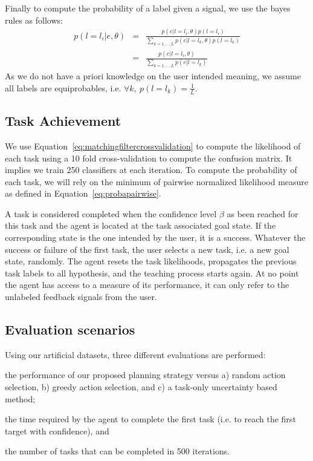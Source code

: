 Finally to compute the probability of a label given a signal, we use the bayes rules as follows: 
%
\begin{eqnarray}
    p(l = l_i|e,\theta) &=& \frac{p(e|l = l_i, \theta)p(l = l_i)}{\sum_{k = 1,\ldots, L}{p(e|l = l_k,\theta)p(l = l_k)}}\nonumber \\
    &=& \frac{p(e|l=l_i, \theta)}{\sum_{k = 1,\ldots, L} p(e|l=l_k)} \nonumber
\end{eqnarray}
%
As we do not have a priori knowledge on the user intended meaning, we assume all labels are equiprobables, i.e. $\forall k,~p(l = l_k) = \frac{1}{L}$.

\subsection{Task Achievement}

We use Equation~\ref{eq:matchingfiltercrossvalidation} to compute the likelihood of each task using a 10 fold cross-validation to compute the confusion matrix. It implies we train 250 classifiers at each iteration. To compute the probability of each task, we will rely on the minimum of pairwise normalized likelihood measure as defined in Equation~\ref{eq:probapairwise}.

A task is considered completed when the confidence level $\beta$ as been reached for this task and the agent is located at the task associated goal state. If the corresponding state is the one intended by the user, it is a success. Whatever the success or failure of the first task, the user selects a new task, i.e. a new goal state, randomly. The agent resets the task likelihoods, propagates the previous task labels to all hypothesis, and the teaching process starts again. At no point the agent has access to a measure of its performance, it can only refer to the unlabeled feedback signals from the user.

\subsection{Evaluation scenarios}

Using our artificial datasets, three different evaluations are performed: \begin{inparaenum}[(i)] \item the performance of our proposed planning strategy versus a) random action selection, b) greedy action selection, and c) a task-only uncertainty based method; \item the time required by the agent to complete the first task (i.e. to reach the first target with confidence), and \item the number of tasks that can be completed in 500 iterations. \end{inparaenum}

